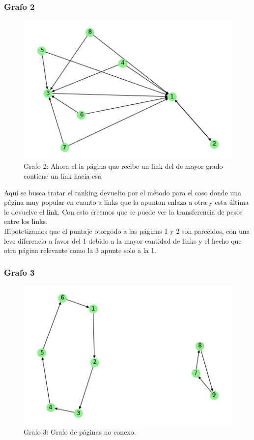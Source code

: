 \subsubsection{Grafo 2}

\begin{figure}[H]
    \begin{center}
        \includegraphics{img/prueba_grafo_2.png}
    \end{center}
\caption{Grafo 2: Ahora el la página que recibe un link del de mayor grado contiene un link hacia esa} \label{fig:exp3-grafo2}
\end{figure}

Aquí se busca tratar el ranking devuelto por el método para el caso donde una página muy popular en cuanto a links que la apuntan enlaza a otra y esta última le devuelve el link. Con esto creemos que se puede ver la transferencia de pesos entre los links. \\

Hipotetizamos que el puntaje otorgodo a las páginas 1 y 2 son parecidos, con una leve diferencia a favor del 1 debido a la mayor cantidad de links y el hecho que otra página relevante como la 3 apunte solo a la 1. \\

\subsubsection{Grafo 3}

\begin{figure}[H]
   \begin{center}
     \includegraphics{img/prueba_3_no_conexa.png} 
  \end{center}
\caption{Grafo 3: Grafo de páginas no conexo.} \label{fig:exp3-noconexo}
\end{figure}

